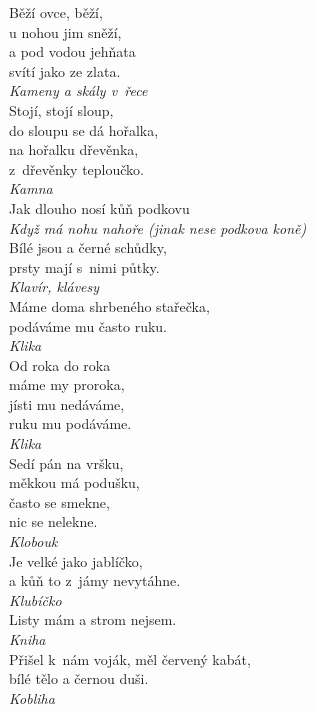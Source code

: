 \begin{multicols}{3}
\noindent
Běží ovce, běží,\\
u nohou jim sněží,\\
a pod vodou jehňata\\
svítí jako ze zlata.\\[1 mm]
{\sl Kameny a skály v~řece}\\

\noindent
Stojí, stojí sloup,\\
do sloupu se dá hořalka,\\
na hořalku dřevěnka,\\
z~dřevěnky teploučko.\\[1 mm]
{\sl Kamna}\\

\noindent
Jak dlouho nosí kůň podkovu\\[1 mm]
{\sl Když má nohu nahoře (jinak nese podkova koně)}\\

\noindent
Bílé jsou a černé schůdky,\\
prsty mají s~nimi půtky.\\[1 mm]
{\sl Klavír, klávesy}\\

\noindent
Máme doma shrbeného stařečka,\\
podáváme mu často ruku.\\[1 mm]
{\sl Klika}\\

\noindent
Od roka do roka\\
máme my proroka,\\
jísti mu nedáváme,\\
ruku mu podáváme.\\[1 mm]
{\sl Klika}\\

\noindent
Sedí pán na vršku,\\
měkkou má podušku,\\
často se smekne,\\
nic se nelekne.\\[1 mm]
{\sl Klobouk}\\

\noindent
Je velké jako jablíčko,\\
a kůň to z~jámy nevytáhne.\\[1 mm]
{\sl Klubíčko}\\

\noindent
Listy mám a strom nejsem.\\[1 mm]
{\sl Kniha}\\

\noindent
Přišel k~nám voják, měl červený kabát,\\
bílé tělo a černou duši.\\[1 mm]
{\sl Kobliha}\\


\end{multicols}
